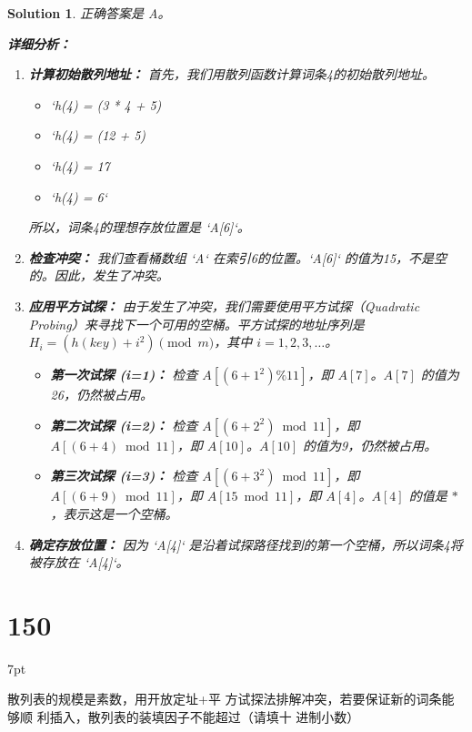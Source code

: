 \documentclass[UTF8]{report}
\newtheorem{solution}{Solution}
\theoremstyle{MyLineTheoremStyle} %
\theoremstyle{MyBlockTheoremStyle} %
\theoremstyle{MySubsubsectionStyle} %
\newenvironment{graybox}{%
        \def\FrameCommand{%
        \hspace{1pt}%
        {\color{gray}\small \vrule width 2pt}%
        {\color{graybox_color}\vrule width 4pt}%
        \colorbox{graybox_color}%
        }%
        \MakeFramed{\advance\hsize-\width\FrameRestore}%
        \noindent\hspace{-4.55pt}%
        \begin{adjustwidth}{}{7pt}%
        \vspace{2pt}\vspace{2pt}%
        }
        {%
        \vspace{2pt}\end{adjustwidth}\endMakeFramed%
        }
\begin{document}
\begin{solution}
正确答案是 A。

\textbf{详细分析：}

\begin{enumerate}
    \item \textbf{计算初始散列地址：}
    首先，我们用散列函数计算词条4的初始散列地址。
    \begin{itemize}
        \item `h(4) = (3 * 4 + 5) %
        \item `h(4) = (12 + 5) %
        \item `h(4) = 17 %
        \item `h(4) = 6`
    \end{itemize}
    所以，词条4的理想存放位置是 `A[6]`。

    \item \textbf{检查冲突：}
    我们查看桶数组 `A` 在索引6的位置。`A[6]` 的值为15，不是空的。因此，发生了冲突。

    \item \textbf{应用平方试探：}
    由于发生了冲突，我们需要使用平方试探（Quadratic Probing）来寻找下一个可用的空桶。平方试探的地址序列是 $H_i = (h(key) + i^2) \pmod{m}$，其中 $i=1, 2, 3, \ldots$。
    \begin{itemize}
        \item \textbf{第一次试探 (i=1)：}
        检查 $A[(6 + 1^2) \% 11]$，即 $A[7]$。$A[7]$ 的值为26，仍然被占用。

        \item \textbf{第二次试探 (i=2)：}
        检查 $A[(6 + 2^2) \bmod 11]$，即 $A[(6 + 4) \bmod 11]$，即 $A[10]$。$A[10]$ 的值为9，仍然被占用。

        \item \textbf{第三次试探 (i=3)：}
        检查 $A[(6 + 3^2) \bmod 11]$，即 $A[(6 + 9) \bmod 11]$，即 $A[15 \bmod 11]$，即 $A[4]$。$A[4]$ 的值是 $*$，表示这是一个空桶。
    \end{itemize}

    \item \textbf{确定存放位置：}
    因为 `A[4]` 是沿着试探路径找到的第一个空桶，所以词条4将被存放在 `A[4]`。
\end{enumerate}
\end{solution}

\section*{150}
\begin{graybox}
散列表的规模是素数，用开放定址+平
方试探法排解冲突，若要保证新的词条能够顺
利插入，散列表的装填因子不能超过（请填十
进制小数）
\underline{\hspace{2cm}}
\end{graybox}
\end{document}
